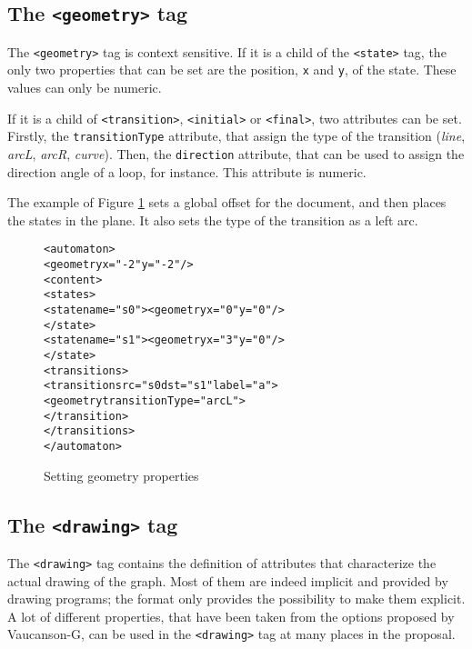 \documentclass[a4paper]{article}
\def\statetag{\texttt{<state>}}
\def\dstname{\texttt{dst}}
\def\srcname{\texttt{src}}
\def\transitiontag{\texttt{<transition>}}
\def\finaltag{\texttt{<final>}}
\def\initialtag{\texttt{<initial>}}
\def\geometrytag{\texttt{<geometry>}}
\def\drawingtag{\texttt{<drawing>}}
\begin{document}
\subsection{The \geometrytag{} tag}

The \geometrytag{} tag is context sensitive. If it is a child of
the \statetag{} tag, the only two properties that can be set are the
position, \verb|x| and \verb|y|, of the state. These values can only be numeric.

If it is a child of \transitiontag{}, \initialtag{} or
\finaltag{}, two attributes can be set. Firstly, the \texttt{transitionType}
attribute, that assign the type of the transition (\textit{line},
\textit{arcL}, \textit{arcR}, \textit{curve}). Then, the
\texttt{direction} attribute, that can be used to assign the direction
angle of a loop, for instance. This attribute is numeric.

The example of Figure \ref{geom1} sets a global offset
for the document, and then places the states in the plane.
It also sets the type of the transition as a left arc.
{\small

\begin{figure}[h]
  \begin{center}
\begin{alltt}
<automaton>
  <geometry x="-2" y="-2"/>
  <content>
     <states>
        <state name="s0"><geometry x="0" y="0"/>
        </state>
        <state name="s1"><geometry x="3" y="0"/>
        </state>
     <transitions>
        <transition \srcname{}="s0 \dstname{}="s1" label="a">
          <geometry transitionType="arcL">
        </transition>
     </transitions>
</automaton>
\end{alltt}

\caption{Setting geometry properties}
\label{geom1}
  \end{center}
\end{figure}

}

\subsection{The \drawingtag{} tag}

The \drawingtag{} tag contains the definition of attributes that characterize
the actual drawing of the graph.
Most of them are indeed implicit and provided by drawing programs; the
format only provides the possibility to make them explicit.
A lot of different properties, that have been taken from the options proposed by
Vaucanson-G, can be used in the \drawingtag{} tag at many places in the proposal.
\end{document}
